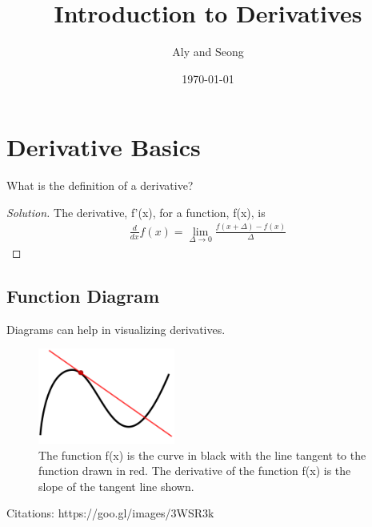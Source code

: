 \documentclass[aps,pra,notitlepage,amsmath,amssymb,letterpaper,12pt]{revtex4-1}
\newenvironment{problem}[2][Problem]{\begin{trivlist}
\item[\hskip \labelsep {\bfseries #1}\hskip \labelsep {\bfseries #2.}]}{\end{trivlist}}
\newenvironment{solution}{\begin{proof}[Solution]}{\end{proof}}
\begin{document}
 
\title{Introduction to Derivatives}
\author{Aly and Seong}
\date{\today}

\maketitle

\section{Derivative Basics} %

\begin{problem}{x.yz} 
What is the definition of a derivative?
\end{problem}
 
\begin{solution} %
The derivative, f'(x), for a function, f(x), is
\begin{align}
\frac{d}{{dx}}f\left( x \right) = \mathop {\lim }\limits_{\Delta \to 0} \frac{{f\left( {x + \Delta } \right) - f\left( x \right)}}{\Delta }
\end{align}
\end{solution}

\subsection{Function Diagram} %

Diagrams can help in visualizing derivatives. 

\begin{figure}[h!] %
  \includegraphics[width=0.4\textwidth]{derivative.png}  %
  \caption{The function f(x) is the curve in black with the line tangent to the function drawn in red. The derivative of the function f(x) is the slope of the tangent line shown.}
  \label{fig:figlabel}
\end{figure}

Citations:
https://goo.gl/images/3WSR3k

 
\end{document}
